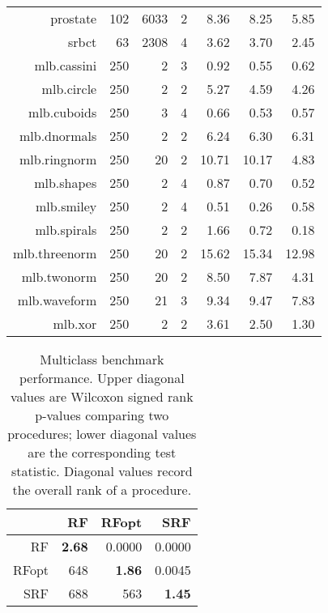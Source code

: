 \documentclass{bmcart}
\def\RFopt{RFopt}
\begin{document}
\begin{backmatter}
\begin{table}[hbt]
\begin{tabular}{rrrrrrr}
  prostate & 102 & 6033 & 2 & 8.36 & 8.25 & 5.85 \\ 
  srbct & 63 & 2308 & 4 & 3.62 & 3.70 & 2.45 \\ 
  mlb.cassini & 250 & 2 & 3 & 0.92 & 0.55 & 0.62 \\ 
  mlb.circle & 250 & 2 & 2 & 5.27 & 4.59 & 4.26 \\ 
  mlb.cuboids & 250 & 3 & 4 & 0.66 & 0.53 & 0.57 \\ 
  mlb.dnormals & 250 & 2 & 2 & 6.24 & 6.30 & 6.31 \\ 
  mlb.ringnorm & 250 & 20 & 2 & 10.71 & 10.17 & 4.83 \\ 
  mlb.shapes & 250 & 2 & 4 & 0.87 & 0.70 & 0.52 \\ 
  mlb.smiley & 250 & 2 & 4 & 0.51 & 0.26 & 0.58 \\ 
  mlb.spirals & 250 & 2 & 2 & 1.66 & 0.72 & 0.18 \\ 
  mlb.threenorm & 250 & 20 & 2 & 15.62 & 15.34 & 12.98 \\ 
  mlb.twonorm & 250 & 20 & 2 & 8.50 & 7.87 & 4.31 \\ 
  mlb.waveform & 250 & 21 & 3 & 9.34 & 9.47 & 7.83 \\ 
  mlb.xor & 250 & 2 & 2 & 3.61 & 2.50 & 1.30 \\ 
  \cline{2-7}
\end{tabular}
\end{table}

\begin{table}[hbt!]
\caption{Multiclass benchmark performance.
  Upper diagonal values are Wilcoxon signed rank p-values comparing
  two procedures; lower diagonal values are the corresponding test
  statistic.  Diagonal values record the overall rank of a procedure.}
\centering
\begin{tabular}{rrrr}
  \hline
 & RF & \RFopt & SRF \\ 
  \hline
  RF & \bf{2.68} & 0.0000 & 0.0000 \\ 
  \RFopt & 648 & \bf{1.86} & 0.0045 \\ 
  SRF & 688 & 563 & \bf{1.45} \\ 
   \hline
\end{tabular}
\end{table}




\end{backmatter}
\end{document}
